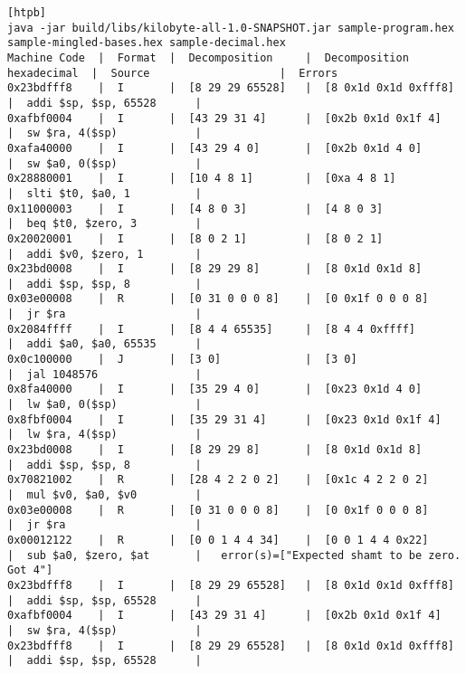 \begin{landscape}
\thispagestyle{empty}
\begin{lstlisting}[style=plain,
    basicstyle=\footnotesize,
    caption=Tabularized output,
    label=listing:tabularized-output,
][htpb]
java -jar build/libs/kilobyte-all-1.0-SNAPSHOT.jar sample-program.hex sample-mingled-bases.hex sample-decimal.hex
Machine Code  |  Format  |  Decomposition     |  Decomposition hexadecimal  |  Source                    |  Errors
0x23bdfff8    |  I       |  [8 29 29 65528]   |  [8 0x1d 0x1d 0xfff8]       |  addi $sp, $sp, 65528      |  
0xafbf0004    |  I       |  [43 29 31 4]      |  [0x2b 0x1d 0x1f 4]         |  sw $ra, 4($sp)            |  
0xafa40000    |  I       |  [43 29 4 0]       |  [0x2b 0x1d 4 0]            |  sw $a0, 0($sp)            |  
0x28880001    |  I       |  [10 4 8 1]        |  [0xa 4 8 1]                |  slti $t0, $a0, 1          |  
0x11000003    |  I       |  [4 8 0 3]         |  [4 8 0 3]                  |  beq $t0, $zero, 3         |  
0x20020001    |  I       |  [8 0 2 1]         |  [8 0 2 1]                  |  addi $v0, $zero, 1        |  
0x23bd0008    |  I       |  [8 29 29 8]       |  [8 0x1d 0x1d 8]            |  addi $sp, $sp, 8          |  
0x03e00008    |  R       |  [0 31 0 0 0 8]    |  [0 0x1f 0 0 0 8]           |  jr $ra                    |  
0x2084ffff    |  I       |  [8 4 4 65535]     |  [8 4 4 0xffff]             |  addi $a0, $a0, 65535      |  
0x0c100000    |  J       |  [3 0]             |  [3 0]                      |  jal 1048576               |  
0x8fa40000    |  I       |  [35 29 4 0]       |  [0x23 0x1d 4 0]            |  lw $a0, 0($sp)            |  
0x8fbf0004    |  I       |  [35 29 31 4]      |  [0x23 0x1d 0x1f 4]         |  lw $ra, 4($sp)            |  
0x23bd0008    |  I       |  [8 29 29 8]       |  [8 0x1d 0x1d 8]            |  addi $sp, $sp, 8          |  
0x70821002    |  R       |  [28 4 2 2 0 2]    |  [0x1c 4 2 2 0 2]           |  mul $v0, $a0, $v0         |  
0x03e00008    |  R       |  [0 31 0 0 0 8]    |  [0 0x1f 0 0 0 8]           |  jr $ra                    |  
0x00012122    |  R       |  [0 0 1 4 4 34]    |  [0 0 1 4 4 0x22]           |  sub $a0, $zero, $at       |   error(s)=["Expected shamt to be zero. Got 4"]
0x23bdfff8    |  I       |  [8 29 29 65528]   |  [8 0x1d 0x1d 0xfff8]       |  addi $sp, $sp, 65528      |  
0xafbf0004    |  I       |  [43 29 31 4]      |  [0x2b 0x1d 0x1f 4]         |  sw $ra, 4($sp)            |  
0x23bdfff8    |  I       |  [8 29 29 65528]   |  [8 0x1d 0x1d 0xfff8]       |  addi $sp, $sp, 65528      | 
\end{lstlisting}
\end{landscape}


